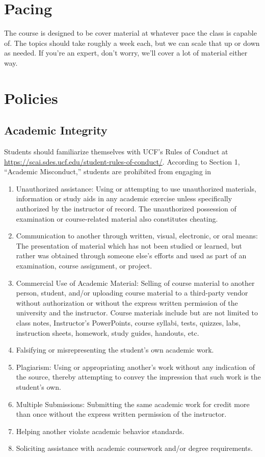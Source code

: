 \documentclass[11pt]{article}
\begin{document}
\section*{Pacing}


The course is designed to be cover material at whatever pace the class is capable of.
The topics should take roughly a week each, but we can scale that up or down as needed.
If you're an expert, don't worry, we'll cover a lot of material either way.



\section*{Policies}

\subsection*{Academic Integrity}

Students should familiarize themselves with UCF’s Rules of Conduct at \url{https://scai.sdes.ucf.edu/student-rules-of-conduct/}. According to Section 1, “Academic Misconduct,” students are prohibited from engaging in

\begin{enumerate}
    \item Unauthorized assistance: Using or attempting to use unauthorized materials, information or study aids in any academic exercise unless specifically authorized by the instructor of record. The unauthorized possession of examination or course-related material also constitutes cheating.
    \item Communication to another through written, visual, electronic, or oral means: The presentation of material which has not been studied or learned, but rather was obtained through someone else’s efforts and used as part of an examination, course assignment, or project.
    \item Commercial Use of Academic Material: Selling of course material to another person, student, and/or uploading course material to a third-party vendor without authorization or without the express written permission of the university and the instructor. Course materials include but are not limited to class notes, Instructor’s PowerPoints, course syllabi, tests, quizzes, labs, instruction sheets, homework, study guides, handouts, etc.
    \item Falsifying or misrepresenting the student’s own academic work.
    \item Plagiarism: Using or appropriating another’s work without any indication of the source, thereby attempting to convey the impression that such work is the student’s own.
    \item Multiple Submissions: Submitting the same academic work for credit more than once without the express written permission of the instructor.
    \item Helping another violate academic behavior standards.
    \item Soliciting assistance with academic coursework and/or degree requirements.
\end{enumerate}
\end{document}
